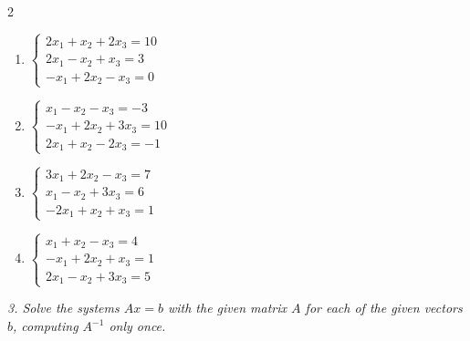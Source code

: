 \begin{multicols}{2}
\begin{enumerate}[label=\arabic*., leftmargin=*]
\item $\begin{cases}2x_1+x_2+2x_3=10\\2x_1-x_2+x_3=3\\-x_1+2x_2-x_3=0\end{cases}$

\item $\begin{cases}x_1-x_2-x_3=-3\\-x_1+2x_2+3x_3=10\\2x_1+x_2-2x_3=-1\end{cases}$

\item $\begin{cases}3x_1+2x_2-x_3=7\\x_1-x_2+3x_3=6\\-2x_1+x_2+x_3=1\end{cases}$

\item $\begin{cases}x_1+x_2-x_3=4\\-x_1+2x_2+x_3=1\\2x_1-x_2+3x_3=5\end{cases}$

\end{enumerate}
\end{multicols}
\emph{3. Solve the systems $Ax=b$ with the given matrix $A$ for each of the given vectors $b$, computing $A^{-1}$ only once.}
\bigskip
